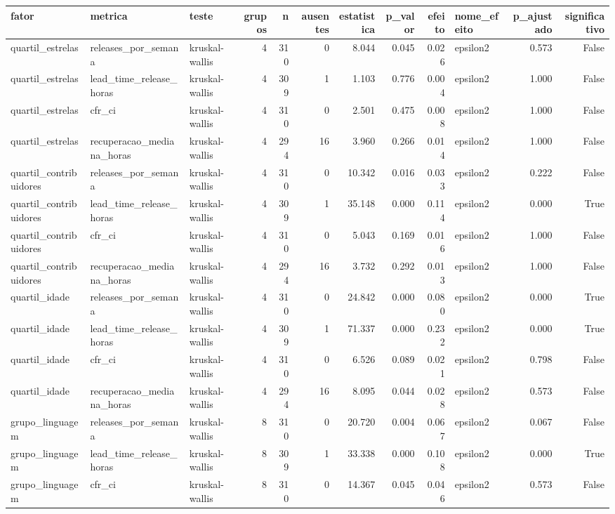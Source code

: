 \begin{tabular}{lllrrrrrrlrr}
\toprule
fator & metrica & teste & grupos & n & ausentes & estatistica & p_valor & efeito & nome_efeito & p_ajustado & significativo \\
\midrule
quartil_estrelas & releases_por_semana & kruskal-wallis & 4 & 310 & 0 & 8.044 & 0.045 & 0.026 & epsilon2 & 0.573 & False \\
quartil_estrelas & lead_time_release_horas & kruskal-wallis & 4 & 309 & 1 & 1.103 & 0.776 & 0.004 & epsilon2 & 1.000 & False \\
quartil_estrelas & cfr_ci & kruskal-wallis & 4 & 310 & 0 & 2.501 & 0.475 & 0.008 & epsilon2 & 1.000 & False \\
quartil_estrelas & recuperacao_mediana_horas & kruskal-wallis & 4 & 294 & 16 & 3.960 & 0.266 & 0.014 & epsilon2 & 1.000 & False \\
quartil_contribuidores & releases_por_semana & kruskal-wallis & 4 & 310 & 0 & 10.342 & 0.016 & 0.033 & epsilon2 & 0.222 & False \\
quartil_contribuidores & lead_time_release_horas & kruskal-wallis & 4 & 309 & 1 & 35.148 & 0.000 & 0.114 & epsilon2 & 0.000 & True \\
quartil_contribuidores & cfr_ci & kruskal-wallis & 4 & 310 & 0 & 5.043 & 0.169 & 0.016 & epsilon2 & 1.000 & False \\
quartil_contribuidores & recuperacao_mediana_horas & kruskal-wallis & 4 & 294 & 16 & 3.732 & 0.292 & 0.013 & epsilon2 & 1.000 & False \\
quartil_idade & releases_por_semana & kruskal-wallis & 4 & 310 & 0 & 24.842 & 0.000 & 0.080 & epsilon2 & 0.000 & True \\
quartil_idade & lead_time_release_horas & kruskal-wallis & 4 & 309 & 1 & 71.337 & 0.000 & 0.232 & epsilon2 & 0.000 & True \\
quartil_idade & cfr_ci & kruskal-wallis & 4 & 310 & 0 & 6.526 & 0.089 & 0.021 & epsilon2 & 0.798 & False \\
quartil_idade & recuperacao_mediana_horas & kruskal-wallis & 4 & 294 & 16 & 8.095 & 0.044 & 0.028 & epsilon2 & 0.573 & False \\
grupo_linguagem & releases_por_semana & kruskal-wallis & 8 & 310 & 0 & 20.720 & 0.004 & 0.067 & epsilon2 & 0.067 & False \\
grupo_linguagem & lead_time_release_horas & kruskal-wallis & 8 & 309 & 1 & 33.338 & 0.000 & 0.108 & epsilon2 & 0.000 & True \\
grupo_linguagem & cfr_ci & kruskal-wallis & 8 & 310 & 0 & 14.367 & 0.045 & 0.046 & epsilon2 & 0.573 & False \\

\end{tabular}
